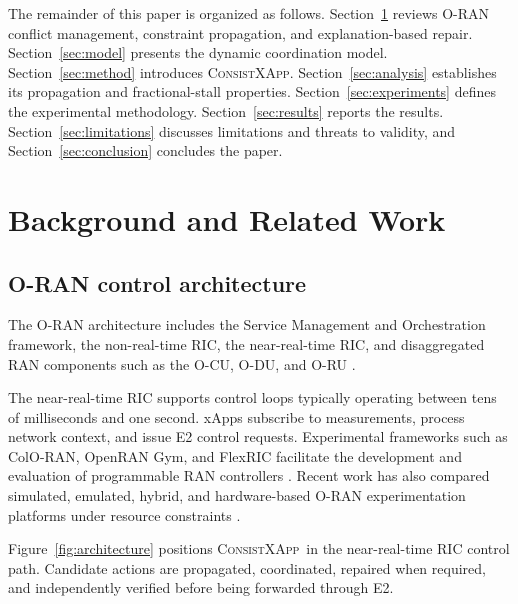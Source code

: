 \documentclass[pdflatex,sn-mathphys-num,iicol,oneside]{sn-jnl}
\newcommand{\method}{\textsc{ConsistXApp}}
\begin{document}
The remainder of this paper is organized as follows.
Section~\ref{sec:background} reviews O-RAN conflict management,
constraint propagation, and explanation-based repair.
Section~\ref{sec:model} presents the dynamic coordination model.
Section~\ref{sec:method} introduces \method.
Section~\ref{sec:analysis} establishes its propagation and
fractional-stall properties.
Section~\ref{sec:experiments} defines the experimental methodology.
Section~\ref{sec:results} reports the results.
Section~\ref{sec:limitations} discusses limitations and threats to
validity, and Section~\ref{sec:conclusion} concludes the paper.

\section{Background and Related Work}
\label{sec:background}

\subsection{O-RAN control architecture}

The O-RAN architecture includes the Service Management and
Orchestration framework, the non-real-time RIC, the near-real-time
RIC, and disaggregated RAN components such as the O-CU, O-DU, and
O-RU \cite{polese2023oran}.

The near-real-time RIC supports control loops typically operating
between tens of milliseconds and one second. xApps subscribe to
measurements, process network context, and issue E2 control requests.
Experimental frameworks such as ColO-RAN, OpenRAN Gym, and FlexRIC
facilitate the development and evaluation of programmable RAN
controllers
\cite{polese2022coloran,bonati2023openrangym,
schmidt2021flexric}. Recent work has also compared simulated,
emulated, hybrid, and hardware-based O-RAN experimentation platforms
under resource constraints \cite{navarro2026demystifying}.

Figure~\ref{fig:architecture} positions \method\ in the
near-real-time RIC control path. Candidate actions are propagated,
coordinated, repaired when required, and independently verified before
being forwarded through E2.
\end{document}
